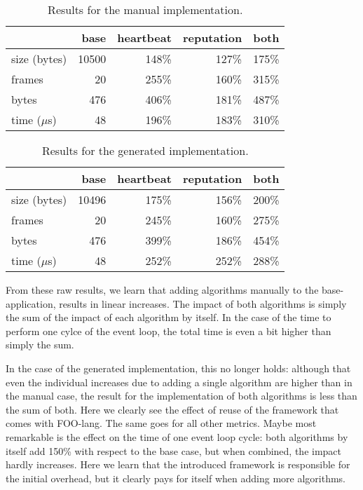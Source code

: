 \documentclass[conference]{IEEEtran}
\begin{document}
\begin{table}[H]
  \centering
  \begin{tabular}{lrrrr}
  \hline
      & base & heartbeat & reputation & both\\
  \hline
  size (bytes) & 10500 & 148\% & 127\% & 175\%\\
  frames & 20 & 255\% & 160\% & 315\%\\
  bytes & 476 & 406\% & 181\% & 487\%\\
  time ($\mu$s) & 48 & 196\% & 183\% & 310\%\\
  \hline
  \end{tabular}
  \caption{Results for the manual implementation.}
  \label{tbl:manual}
\end{table}

\begin{table}[H]
  \centering
  \begin{tabular}{lrrrr}
  \hline
         & base & heartbeat & reputation & both\\
  \hline
  size (bytes) & 10496 & 175\% & 156\% & 200\%\\
  frames & 20 & 245\% & 160\% & 275\%\\
  bytes & 476 & 399\% & 186\% & 454\%\\
  time ($\mu$s) & 48 & 252\% & 252\% & 288\%\\
  \hline
  \end{tabular}
  \caption{Results for the generated implementation.}
  \label{tbl:generated}
\end{table}

From these raw results, we learn that adding algorithms manually to the
base-application, results in linear increases. The impact of both algorithms is
simply the sum of the impact of each algorithm by itself. In the case of the
time to perform one cylce of the event loop, the total time is even a bit
higher than simply the sum.

In the case of the generated implementation, this no longer holds: although
that even the individual increases due to adding a single algorithm are higher
than in the manual case, the result for the implementation of both algorithms
is less than the sum of both. Here we clearly see the effect of reuse of the
framework that comes with FOO-lang. The same goes for all other metrics. Maybe
most remarkable is the effect on the time of one event loop cycle: both
algorithms by itself add 150\% with respect to the base case, but when
combined, the impact hardly increases. Here we learn that the introduced
framework is responsible for the initial overhead, but it clearly pays for
itself when adding more algorithms.
\end{document}
